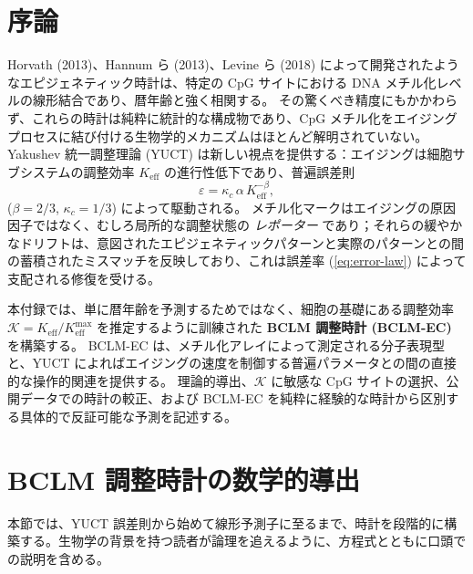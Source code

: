 \documentclass[12pt,a4paper]{ltjsarticle}
\newcommand{\REL}{\mathcal{K}}          %
\begin{document}
	\section{序論}
	\label{sec:intro}
	Horvath (2013)、Hannum ら (2013)、Levine ら (2018) によって開発されたようなエピジェネティック時計は、特定の CpG サイトにおける DNA メチル化レベルの線形結合であり、暦年齢と強く相関する。
	その驚くべき精度にもかかわらず、これらの時計は純粋に統計的な構成物であり、CpG メチル化をエイジングプロセスに結び付ける生物学的メカニズムはほとんど解明されていない。
	Yakushev 統一調整理論 (YUCT) は新しい視点を提供する：エイジングは細胞サブシステムの調整効率 \(K_{\mathrm{eff}}\) の進行性低下であり、普遍誤差則
	\begin{equation}
		\varepsilon = \kappa_c \, \alpha \, K_{\mathrm{eff}}^{-\beta},
		\label{eq:error-law}
	\end{equation}
	(\(\beta = 2/3\), \(\kappa_c = 1/3\)) によって駆動される。
	メチル化マークはエイジングの原因因子ではなく、むしろ局所的な調整状態の \emph{レポーター} であり；それらの緩やかなドリフトは、意図されたエピジェネティックパターンと実際のパターンとの間の蓄積されたミスマッチを反映しており、これは誤差率 (\ref{eq:error-law}) によって支配される修復を受ける。
	
	本付録では、単に暦年齢を予測するためではなく、細胞の基礎にある調整効率 \(\REL = K_{\mathrm{eff}}/K_{\mathrm{eff}}^{\max}\) を推定するように訓練された \textbf{BCLM 調整時計 (BCLM-EC)} を構築する。
	BCLM-EC は、メチル化アレイによって測定される分子表現型と、YUCT によればエイジングの速度を制御する普遍パラメータとの間の直接的な操作的関連を提供する。
	理論的導出、\(\REL\) に敏感な CpG サイトの選択、公開データでの時計の較正、および BCLM-EC を純粋に経験的な時計から区別する具体的で反証可能な予測を記述する。
	
	\section{BCLM 調整時計の数学的導出}
	\label{sec:math}
	本節では、YUCT 誤差則から始めて線形予測子に至るまで、時計を段階的に構築する。生物学の背景を持つ読者が論理を追えるように、方程式とともに口頭での説明を含める。
	
\end{document}
